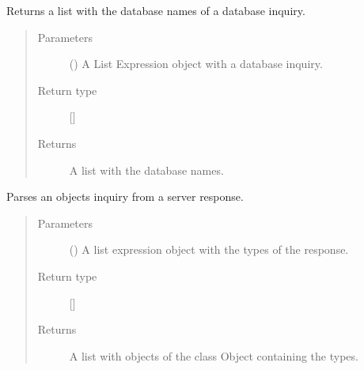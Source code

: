 \documentclass[letterpaper,10pt,english]{sphinxmanual}
\begin{document}

\begin{fulllineitems}
\label{\detokenize{index:secondodb.api.support.secondoparser.parse_inquiry_databases}}
Returns a list with the database names of a database inquiry.
\begin{quote}\begin{description}
\item[{Parameters}] \leavevmode
{} () \textendash{} A List Expression object with a database inquiry.

\item[{Return type}] \leavevmode
{[}{]}

\item[{Returns}] \leavevmode
A list with the database names.

\end{description}\end{quote}

\end{fulllineitems}


\begin{fulllineitems}
\label{\detokenize{index:secondodb.api.support.secondoparser.parse_inquiry_objects}}
Parses an objects inquiry from a  server response.
\begin{quote}\begin{description}
\item[{Parameters}] \leavevmode
{} () \textendash{} A list expression object with the types of the response.

\item[{Return type}] \leavevmode
{[}{]}

\item[{Returns}] \leavevmode
A list with objects of the class Object containing the types.

\end{description}\end{quote}

\end{fulllineitems}
\end{document}
